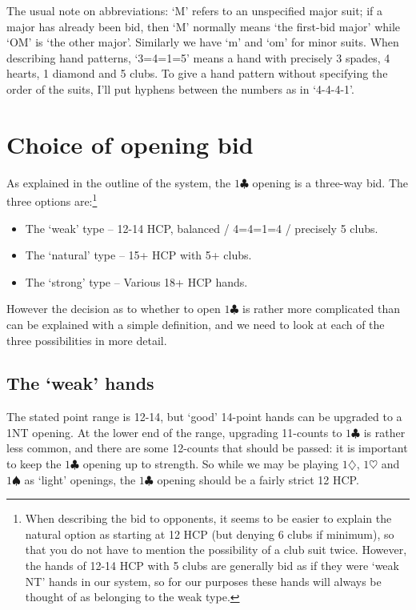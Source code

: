 \documentclass{article}
\newcommand{\sz}{\spadesuit}
\newcommand{\hz}{\heartsuit}
\newcommand{\dz}{\diamondsuit}
\newcommand{\cz}{\clubsuit}
\begin{document}
\vspace{4mm}
The usual note on abbreviations: `M' refers to an unspecified major suit; if a major has already been bid, then `M' normally means `the first-bid major' while `OM' is `the other major'. Similarly we have `m' and `om' for minor suits. When describing hand patterns, `3=4=1=5' means a hand with precisely 3 spades, 4 hearts, 1 diamond and 5 clubs. To give a hand pattern without specifying the order of the suits, I'll put hyphens between the numbers as in `4-4-4-1'.


\newpage
\section{Choice of opening bid}

As explained in the outline of the system, the $1\cz$ opening is a three-way bid. The three options are:\footnote{When describing the bid to opponents, it seems to be easier to explain the natural option as starting at 12 HCP (but denying 6 clubs if minimum), so that you do not have to mention the possibility of a club suit twice. However, the hands of 12-14 HCP with 5 clubs are generally bid as if they were `weak NT' hands in our system, so for our purposes these hands will always be thought of as belonging to the weak type.}

\begin{itemize}
\item The `weak' type -- 12-14 HCP, balanced / 4=4=1=4 / precisely 5 clubs.
\item The `natural' type -- 15+ HCP with 5+ clubs.
\item The `strong' type -- Various 18+ HCP hands.
\end{itemize}

However the decision as to whether to open $1\cz$ is rather more complicated than can be explained with a simple definition, and we need to look at each of the three possibilities in more detail.

\subsection{The `weak' hands}

The stated point range is 12-14, but `good' 14-point hands can be upgraded to a 1NT opening. At the lower end of the range, upgrading 11-counts to $1\cz$ is rather less common, and there are some 12-counts that should be passed: it is important to keep the $1\cz$ opening up to strength. So while we may be playing $1\dz$, $1\hz$ and $1\sz$ as `light' openings, the $1\cz$ opening should be a fairly strict 12 HCP.
\end{document}
